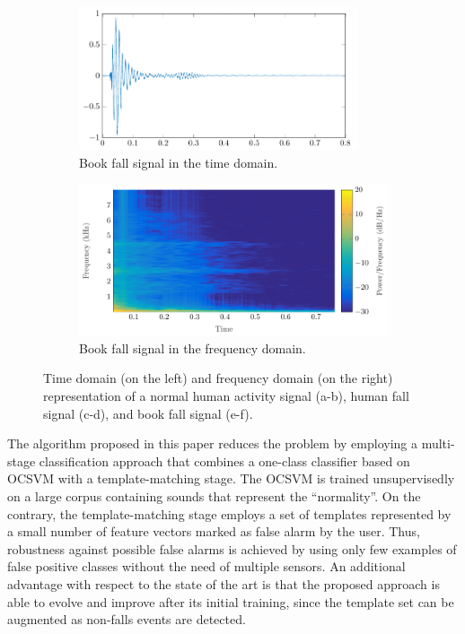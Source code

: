 \begin{figure}[htbp!]
	\begin{subfigure}[t]{0.5\columnwidth}
		\centering
		\includegraphics[width=0.9\textwidth]{img/cin/book_time_.pdf}
		\caption{Book fall signal in the time domain.}\label{fig:time_bf}
	\end{subfigure}%
	\begin{subfigure}[t]{0.5\columnwidth}
		\centering
		\includegraphics[width=\textwidth]{img/cin/book_freq_.pdf}
		\caption{Book fall signal in the frequency domain.}\label{fig:spec_bf}
	\end{subfigure}
	\caption{Time domain (on the left) and frequency domain (on the right) representation of a normal human activity signal (a-b), human fall signal (c-d), and book fall signal (e-f).}\label{fig:waveforms}
\end{figure}

The algorithm proposed in this paper reduces the problem by employing a multi-stage classification approach that combines a one-class classifier based on OCSVM with a template-matching stage. The OCSVM is trained unsupervisedly on a large corpus containing sounds that represent the ``normality''. On the contrary, the template-matching stage employs a set of templates represented by a small number of feature vectors marked as false alarm by the user. Thus, robustness against possible false alarms is achieved by using only few examples of false positive classes without the need of multiple sensors. An additional advantage with respect to the state of the art is that the proposed approach is able to evolve and improve after its initial training, since the template set can be augmented as non-falls events are detected.

